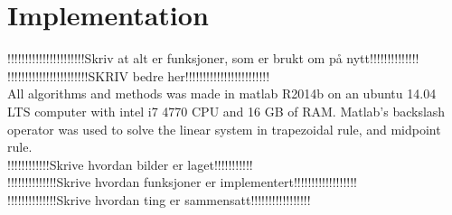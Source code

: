\section{Implementation} %
!!!!!!!!!!!!!!!!!!!!!!Skriv at alt er funksjoner, som er brukt om på nytt!!!!!!!!!!!!!!\\
!!!!!!!!!!!!!!!!!!!!!!!SKRIV bedre her!!!!!!!!!!!!!!!!!!!!!!!!\\
All algorithms and methods was made in matlab R2014b on an ubuntu 14.04 LTS computer with intel i7 4770 CPU and 16 GB of RAM. Matlab's backslash operator was used to solve the linear system in trapezoidal rule, and midpoint rule. \\
!!!!!!!!!!!!Skrive hvordan bilder er laget!!!!!!!!!!!\\
!!!!!!!!!!!!!!Skrive hvordan funksjoner er implementert!!!!!!!!!!!!!!!!!!\\
!!!!!!!!!!!!!!Skrive hvordan ting er sammensatt!!!!!!!!!!!!!!!!!\\


 
